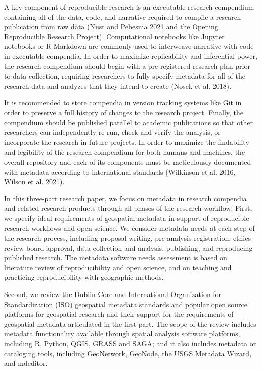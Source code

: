 \documentclass{isprs} %
\begin{document}
A key component of reproducible research is an executable research compendium containing all of the data, code, and narrative required to compile a research publication from raw data (Nust and Pebesma 2021 and the Opening Reproducible Research Project).
Computational notebooks like Jupyter notebooks or R Markdown are commonly used to interweave narrative with code in executable compendia.
In order to maximize replicability and inferential power, the research compendium should begin with a pre-registered research plan prior to data collection, requiring researchers to fully specify metadata for all of the research data and analyzes that they intend to create (Nosek et al. 2018).

It is recommended to store compendia in version tracking systems like Git in order to preserve a full history of changes to the research project.
Finally, the compendium should be published parallel to academic publications so that other researchers can independently re-run, check and verify the analysis, or incorporate the research in future projects.
In order to maximize the findability and legibility of the research compendium for both humans and machines, the overall repository and each of its components must be meticulously documented with metadata according to international standards (Wilkinson et al. 2016, Wilson et al. 2021).

In this three-part research paper, we focus on metadata in research compendia and related research products through all phases of the research workflow.
First, we specify ideal requirements of geospatial metadata in support of reproducible research workflows and open science.
We consider metadata needs at each step of the research process, including proposal writing, pre-analysis registration, ethics review board approval, data collection and analysis, publishing, and reproducing published research.
The metadata software needs assessment is based on literature review of reproducibility and open science, and on teaching and practicing reproducibility with geographic methods.

Second, we review the Dublin Core and International Organization for Standardization (ISO) geospatial metadata standards and popular open source platforms for geospatial research and their support for the requirements of geospatial metadata articulated in the first part.
The scope of the review includes metadata functionality available through spatial analysis software platforms, including R, Python, QGIS, GRASS and SAGA; and it also includes metadata or cataloging tools, including GeoNetwork, GeoNode, the USGS Metadata Wizard, and mdeditor.
\end{document}
